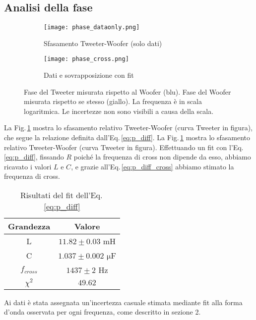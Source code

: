 \documentclass[../Relazione_circuiti]{subfiles}
\begin{document}
\subsection{Analisi della fase}

  \begin{figure}[H]
    \centering

    \begin{subfigure}{=0.49\textwidth}
      \centering
      \texttt{[image: phase\_dataonly.png]}
      \caption{Sfasamento Tweeter-Woofer (solo dati)}
      \label{fig: pdiff_dataonly}

    \end{subfigure}
    \hfill
    \begin{subfigure}{=0.49\textwidth}
      \centering
      \texttt{[image: phase\_cross.png]}
      \caption{Dati e sovrapposizione con fit}
      \label{fig: pdiff_fit_data}

    \end{subfigure}

    \caption{Fase del Tweeter misurata rispetto al Woofer (blu). Fase del Woofer misurata rispetto se stesso (giallo).
    La frequenza è in scala logaritmica. Le incertezze non sono visibili a causa della scala.}
    \label{fig: phase_diff}

  \end{figure}

  La Fig.\,\ref{fig: pdiff_dataonly}
  mostra lo sfasamento relativo Tweeter-Woofer (curva Tweeter in figura), che segue la
  relazione definita dall'Eq.\,\eqref{eq:p_diff}.
  La Fig.\,\ref{fig: pdiff_dataonly} mostra lo sfasamento relativo Tweeter-Woofer (curva Tweeter in figura).
  Effettuando un fit con l'Eq.\,\eqref{eq:p_diff}, fissando $R$
  poiché la frequenza di cross non dipende da esso, abbiamo
  ricavato i valori $L$ e $C$, e grazie all'Eq.\,\eqref{eq:p_diff_cross} abbiamo stimato la frequenza di cross.


  \begin{table}[H]
    \centering

    \begin{tabular}{c | c }
      Grandezza   & Valore                             \\
      \hline
      L           & $ 11.82 \pm 0.03 $  mH               \\
      C           & $ 1.037 \pm 0.002 $  $\mathrm{\mu}$F \\
      $f_{cross}$ & $ 1437 \pm 2$  Hz                    \\
      $\chi^2$    & $49.62$

    \end{tabular}
    \caption{Risultati del fit dell'Eq.\,\eqref{eq:p_diff}}
    \label{tab:fit_phase}

  \end{table}
  Ai dati è stata assegnata un'incertezza casuale stimata mediante fit alla forma d'onda osservata per ogni frequenza,
  come descritto in sezione 2.
\end{document}
